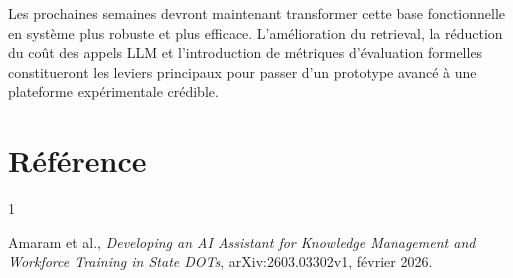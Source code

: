 \documentclass[12pt,a4paper]{report}
\begin{document}
Les prochaines semaines devront maintenant transformer cette base fonctionnelle en système plus robuste et plus efficace. L'amélioration du retrieval, la réduction du coût des appels LLM et l'introduction de métriques d'évaluation formelles constitueront les leviers principaux pour passer d'un prototype avancé à une plateforme expérimentale crédible.

\appendix
\chapter{Référence}

\begin{thebibliography}{1}

Amaram et al.,
\textit{Developing an AI Assistant for Knowledge Management and Workforce Training in State DOTs},
arXiv:2603.03302v1, février 2026.

\end{thebibliography}
\end{document}
